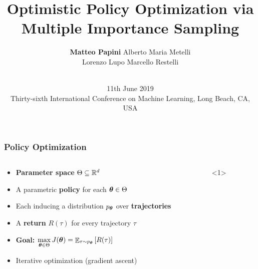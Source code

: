 \documentclass[aspectratio=169, table]{beamer}
\title{Optimistic Policy Optimization via Multiple Importance Sampling}
\date[AAA]{\vspace{0.2cm} \\ \small{ 11th June 2019 \\ Thirty-sixth International Conference on Machine Learning, Long Beach, CA, {USA}}}
\author[M. Papini]{\textbf{Matteo Papini} \quad Alberto Maria Metelli\\
						\small{Lorenzo Lupo \quad Marcello Restelli}}
\newcommand{\enb}[1]{\textcolor{poliblue1}{\textbf{#1}}}
\begin{document}

\begin{frame}[noframenumbering]
\titlepage
\end{frame}

\begin{frame}
\frametitle{Policy Optimization} 
\begin{columns}
\begin{column}{.65\textwidth}
\begin{overlayarea}{\textwidth}{\textheight}
\begin{itemize}
	\setlength{\itemsep}{20pt}
	\item \enb{Parameter space} $\Theta \subseteq \mathbb{R}^d$
	\item<2-> A parametric \enb{policy} for each $\boldsymbol{\theta}\in\Theta$
	\item<3-> Each inducing a distribution $p_{\boldsymbol{\theta}}$ over \enb{trajectories}
	\item<4-> A \enb{return} $R(\tau)$ for every trajectory $\tau$
	\item<5-> {\enb{Goal:} $\max\limits_{\boldsymbol{\theta}\in\Theta} J(\boldsymbol{\theta}) = \mathop{\mathbb{E}}_{\tau\sim p_{\boldsymbol{\theta}}}\left[R(\tau)\right]$}
	\item<6-> Iterative optimization (\eg gradient ascent)
\end{itemize}
\end{overlayarea}
\end{column}
\begin{column}{.35\textwidth}
\begin{overlayarea}{\textwidth}{\textheight}

\end{overlayarea}
\end{column}
\end{columns}
\end{frame}
\end{document}
